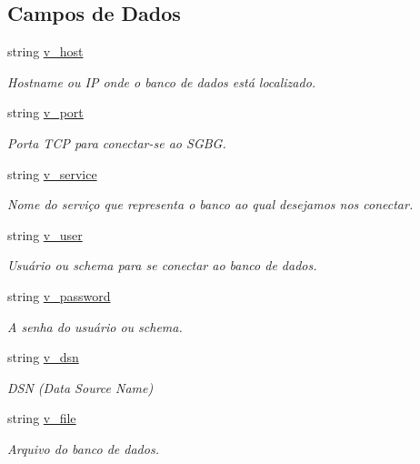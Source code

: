 \subsection*{Campos de Dados}
\begin{DoxyCompactItemize}
\item 
string \hyperlink{classSpartacus_1_1Database_1_1Generic_adcf095a019d81c98b5f4c23ffe010cc4}{v\+\_\+host}
\begin{DoxyCompactList}\small\item\em Hostname ou I\+P onde o banco de dados está localizado. \end{DoxyCompactList}\item 
string \hyperlink{classSpartacus_1_1Database_1_1Generic_a5df6e2c77be89b3e34903ca4fc0068d0}{v\+\_\+port}
\begin{DoxyCompactList}\small\item\em Porta T\+C\+P para conectar-\/se ao S\+G\+B\+G. \end{DoxyCompactList}\item 
string \hyperlink{classSpartacus_1_1Database_1_1Generic_a3b7fd3196d76de6475c4a18edbfeea8f}{v\+\_\+service}
\begin{DoxyCompactList}\small\item\em Nome do serviço que representa o banco ao qual desejamos nos conectar. \end{DoxyCompactList}\item 
string \hyperlink{classSpartacus_1_1Database_1_1Generic_a945755698e1b479f3e581ea918338ef5}{v\+\_\+user}
\begin{DoxyCompactList}\small\item\em Usuário ou schema para se conectar ao banco de dados. \end{DoxyCompactList}\item 
string \hyperlink{classSpartacus_1_1Database_1_1Generic_a7a40ef878e5d8371034ced66a7b7b2bb}{v\+\_\+password}
\begin{DoxyCompactList}\small\item\em A senha do usuário ou schema. \end{DoxyCompactList}\item 
string \hyperlink{classSpartacus_1_1Database_1_1Generic_a91f7c26ea6ab2875fbeafc42905b423f}{v\+\_\+dsn}
\begin{DoxyCompactList}\small\item\em D\+S\+N (Data Source Name) \end{DoxyCompactList}\item 
string \hyperlink{classSpartacus_1_1Database_1_1Generic_a2afdda7bc7ad1bad84a5dc08bf6bd4e6}{v\+\_\+file}
\begin{DoxyCompactList}\small\item\em Arquivo do banco de dados. \end{DoxyCompactList}\end{DoxyCompactItemize}


